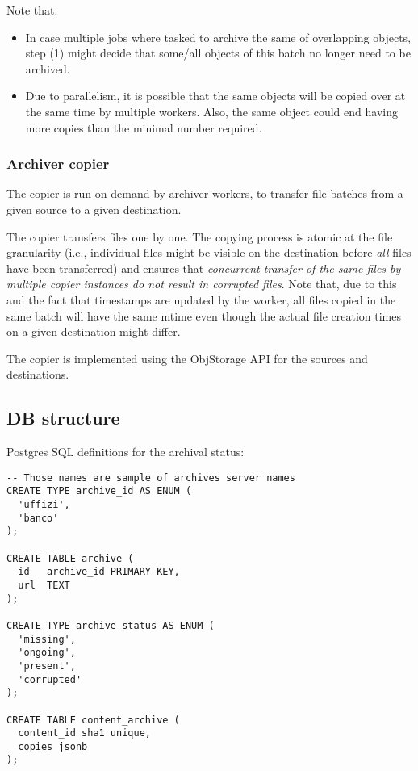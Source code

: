 Note that:

\begin{itemize}
\item
  In case multiple jobs where tasked to archive the same of overlapping
  objects, step (1) might decide that some/all objects of this batch no
  longer need to be archived.
\item
  Due to parallelism, it is possible that the same objects will be
  copied over at the same time by multiple workers. Also, the same
  object could end having more copies than the minimal number required.
\end{itemize}

\subsubsection{Archiver copier}\label{archiver-copier-1}

The copier is run on demand by archiver workers, to transfer file
batches from a given source to a given destination.

The copier transfers files one by one. The copying process is atomic at
the file granularity (i.e., individual files might be visible on the
destination before \emph{all} files have been transferred) and ensures
that \emph{concurrent transfer of the same files by multiple copier
instances do not result in corrupted files}. Note that, due to this and
the fact that timestamps are updated by the worker, all files copied in
the same batch will have the same mtime even though the actual file
creation times on a given destination might differ.

The copier is implemented using the ObjStorage API for the sources and
destinations.

\subsection{DB structure}\label{db-structure-1}

Postgres SQL definitions for the archival status:

\begin{verbatim}
-- Those names are sample of archives server names
CREATE TYPE archive_id AS ENUM (
  'uffizi',
  'banco'
);

CREATE TABLE archive (
  id   archive_id PRIMARY KEY,
  url  TEXT
);

CREATE TYPE archive_status AS ENUM (
  'missing',
  'ongoing',
  'present',
  'corrupted'
);

CREATE TABLE content_archive (
  content_id sha1 unique,
  copies jsonb
);
\end{verbatim}


